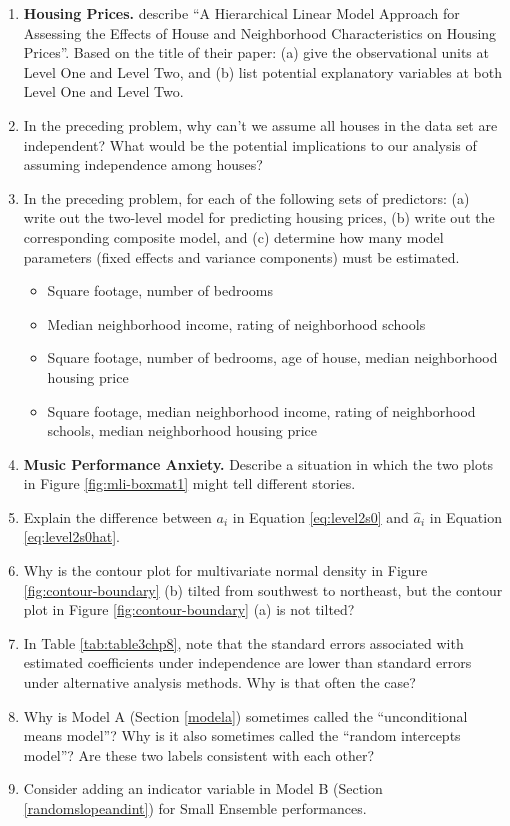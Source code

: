 \documentclass[
]{krantz}
\providecommand{\tightlist}{%
  \setlength{\itemsep}{0pt}\setlength{\parskip}{0pt}}
\begin{document}
\begin{enumerate}
\def\labelenumi{\arabic{enumi}.}
\item
  \textbf{Housing Prices.} \citet{Brown2004} describe ``A Hierarchical Linear Model Approach for Assessing the Effects of House and Neighborhood Characteristics on Housing Prices''. Based on the title of their paper: (a) give the observational units at Level One and Level Two, and (b) list potential explanatory variables at both Level One and Level Two.
\item
  In the preceding problem, why can't we assume all houses in the data set are independent? What would be the potential implications to our analysis of assuming independence among houses?
\item
  In the preceding problem, for each of the following sets of predictors: (a) write out the two-level model for predicting housing prices, (b) write out the corresponding composite model, and (c) determine how many model parameters (fixed effects and variance components) must be estimated.

  \begin{itemize}
  \tightlist
  \item
    Square footage, number of bedrooms
  \item
    Median neighborhood income, rating of neighborhood schools
  \item
    Square footage, number of bedrooms, age of house, median neighborhood housing price
  \item
    Square footage, median neighborhood income, rating of neighborhood schools, median neighborhood housing price
  \end{itemize}
\item
  \textbf{Music Performance Anxiety.} Describe a situation in which the two plots in Figure \ref{fig:mli-boxmat1} might tell different stories.
\item
  Explain the difference between \(a_{i}\) in Equation \eqref{eq:level2s0} and \(\hat{a}_{i}\) in Equation \eqref{eq:level2s0hat}.
\item
  Why is the contour plot for multivariate normal density in Figure \ref{fig:contour-boundary} (b) tilted from southwest to northeast, but the contour plot in Figure \ref{fig:contour-boundary} (a) is not tilted?
\item
  In Table \ref{tab:table3chp8}, note that the standard errors associated with estimated coefficients under independence are lower than standard errors under alternative analysis methods. Why is that often the case?
\item
  Why is Model A (Section \ref{modela}) sometimes called the ``unconditional means model''? Why is it also sometimes called the ``random intercepts model''? Are these two labels consistent with each other?
\item
  Consider adding an indicator variable in Model B (Section \ref{randomslopeandint}) for Small Ensemble performances.


\end{enumerate}
\end{document}
